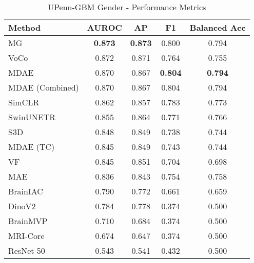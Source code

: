 \begin{table}[ht]
\centering
\caption{UPenn-GBM Gender - Performance Metrics}
\label{tab:upenn_gbm_gender}
\begin{tabular}{lcccc}
\toprule
Method & AUROC & AP & F1 & Balanced Acc \\
\midrule
MG & \textbf{0.873} & \textbf{0.873} & 0.800 & 0.794 \\
VoCo & 0.872 & 0.871 & 0.764 & 0.755 \\
MDAE & 0.870 & 0.867 & \textbf{0.804} & \textbf{0.794} \\
MDAE (Combined) & 0.870 & 0.867 & 0.804 & 0.794 \\
SimCLR & 0.862 & 0.857 & 0.783 & 0.773 \\
SwinUNETR & 0.855 & 0.864 & 0.771 & 0.766 \\
S3D & 0.848 & 0.849 & 0.738 & 0.744 \\
MDAE (TC) & 0.845 & 0.849 & 0.743 & 0.744 \\
VF & 0.845 & 0.851 & 0.704 & 0.698 \\
MAE & 0.836 & 0.843 & 0.754 & 0.758 \\
BrainIAC & 0.790 & 0.772 & 0.661 & 0.659 \\
DinoV2 & 0.784 & 0.778 & 0.374 & 0.500 \\
BrainMVP & 0.710 & 0.684 & 0.374 & 0.500 \\
MRI-Core & 0.674 & 0.647 & 0.374 & 0.500 \\
ResNet-50 & 0.543 & 0.541 & 0.432 & 0.500 \\
\bottomrule
\end{tabular}
\end{table}
